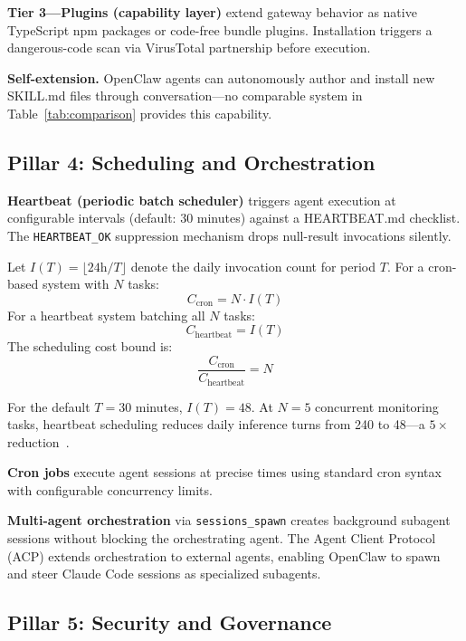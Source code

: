 \documentclass[journal]{IEEEtran}
\begin{document}
\textbf{Tier 3---Plugins (capability layer)} extend gateway behavior as native
TypeScript npm packages or code-free bundle plugins. Installation triggers a
dangerous-code scan via VirusTotal partnership before execution.

\textbf{Self-extension.} OpenClaw agents can autonomously author and install
new SKILL.md files through conversation---no comparable system in
Table~\ref{tab:comparison} provides this capability.

\subsection{Pillar 4: Scheduling and Orchestration}

\textbf{Heartbeat (periodic batch scheduler)} triggers agent execution at
configurable intervals (default: 30 minutes) against a HEARTBEAT.md checklist.
The \texttt{HEARTBEAT\_OK} suppression mechanism drops null-result invocations
silently.

Let $I(T) = \lfloor 24\text{h}/T \rfloor$ denote the daily invocation count for
period $T$. For a cron-based system with $N$ tasks:
\begin{equation}
  C_{\text{cron}} = N \cdot I(T)
  \label{eq:cron}
\end{equation}
For a heartbeat system batching all $N$ tasks:
\begin{equation}
  C_{\text{heartbeat}} = I(T)
  \label{eq:heartbeat}
\end{equation}
The scheduling cost bound is:
\begin{equation}
  \frac{C_{\text{cron}}}{C_{\text{heartbeat}}} = N
  \label{eq:bound}
\end{equation}

For the default $T = 30$ minutes, $I(T) = 48$. At $N = 5$ concurrent
monitoring tasks, heartbeat scheduling reduces daily inference turns from 240
to 48---a $5\times$ reduction~\cite{openclaw2024docs}.

\textbf{Cron jobs} execute agent sessions at precise times using standard cron
syntax with configurable concurrency limits.

\textbf{Multi-agent orchestration} via \texttt{sessions\_spawn} creates
background subagent sessions without blocking the orchestrating agent. The
Agent Client Protocol (ACP) extends orchestration to external agents, enabling
OpenClaw to spawn and steer Claude Code sessions as specialized subagents.

\subsection{Pillar 5: Security and Governance}
\end{document}
